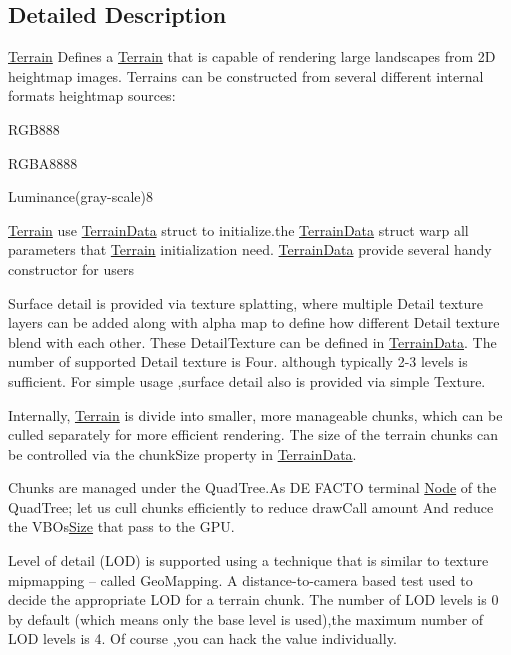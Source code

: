\subsection{Detailed Description}
\hyperlink{classTerrain}{Terrain} Defines a \hyperlink{classTerrain}{Terrain} that is capable of rendering large landscapes from 2D heightmap images. Terrains can be constructed from several different internal formats heightmap sources\+:
\begin{DoxyEnumerate}
\item R\+G\+B888
\item R\+G\+B\+A8888
\item Luminance(gray-\/scale)8
\end{DoxyEnumerate}

\hyperlink{classTerrain}{Terrain} use \hyperlink{structTerrain_1_1TerrainData}{Terrain\+Data} struct to initialize.\+the \hyperlink{structTerrain_1_1TerrainData}{Terrain\+Data} struct warp all parameters that \hyperlink{classTerrain}{Terrain} initialization need. \hyperlink{structTerrain_1_1TerrainData}{Terrain\+Data} provide several handy constructor for users

Surface detail is provided via texture splatting, where multiple Detail texture layers can be added along with alpha map to define how different Detail texture blend with each other. These Detail\+Texture can be defined in \hyperlink{structTerrain_1_1TerrainData}{Terrain\+Data}. The number of supported Detail texture is Four. although typically 2-\/3 levels is sufficient. For simple usage ,surface detail also is provided via simple Texture.

Internally, \hyperlink{classTerrain}{Terrain} is divide into smaller, more manageable chunks, which can be culled separately for more efficient rendering. The size of the terrain chunks can be controlled via the chunk\+Size property in \hyperlink{structTerrain_1_1TerrainData}{Terrain\+Data}.

Chunks are managed under the Quad\+Tree.\+As DE F\+A\+C\+TO terminal \hyperlink{classNode}{Node} of the Quad\+Tree; let us cull chunks efficiently to reduce draw\+Call amount And reduce the V\+B\+Os\textquotesingle{}\hyperlink{classSize}{Size} that pass to the G\+PU.

Level of detail (L\+OD) is supported using a technique that is similar to texture mipmapping -- called Geo\+Mapping. A distance-\/to-\/camera based test used to decide the appropriate L\+OD for a terrain chunk. The number of L\+OD levels is 0 by default (which means only the base level is used),the maximum number of L\+OD levels is 4. Of course ,you can hack the value individually.

